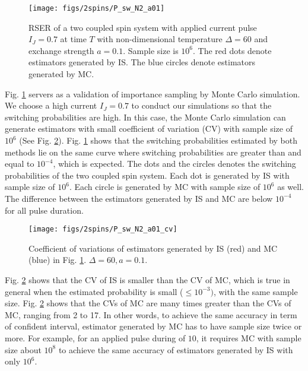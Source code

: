 \documentclass[journal,transmag]{IEEEtran}
\begin{document}
  \begin{figure}[h]
   \centering
         \texttt{[image: figs/2spins/P\_sw\_N2\_a01]}    
   \caption{RSER of a two coupled spin system with applied current pulse $I_J = 0.7$ at time $T$ with non-dimensional temperature $\Delta = 60$ and exchange strength $ a = 0.1$. Sample size is $10^6$. The red dots denote estimators generated by IS.  The blue circles denote estimators generated by MC.  }
   \label{figs:ISvsMC1_1}
\end{figure}
Fig. \ref{figs:ISvsMC1_1} servers as a validation of importance sampling by Monte Carlo simulation. We choose a high current $I_J = 0.7$ to conduct our simulations so that the switching probabilities are high. In this case, the Monte Carlo simulation can generate estimators with small coefficient of variation (CV) with sample size of $10^6$ (See Fig. \ref{figs:ISvsMC1_2}). 
Fig. \ref{figs:ISvsMC1_1}  shows that the switching probabilities estimated by both methods lie on the same curve where switching probabilities are greater than and equal to $10^{-4}$, which is expected. The dots and the circles denotes the switching probabilities of the two coupled spin system. Each dot is generated by IS with sample size of $10^6$. Each circle is generated by MC with sample size of $10^6$ as well.  The difference between the estimators generated by IS and MC are below $10^{-4}$ for all pulse duration.
  \begin{figure}[h]
   \centering
         \texttt{[image: figs/2spins/P\_sw\_N2\_a01\_cv]}    
   \caption{Coefficient of variations of estimators generated by IS (red) and MC (blue) in Fig. \ref{figs:ISvsMC1_1}. $\Delta = 60, a = 0.1$. }
   \label{figs:ISvsMC1_2}
\end{figure}
%
Fig. \ref{figs:ISvsMC1_2} shows that the CV of IS is smaller than the CV of MC, which is true in general when the estimated probability is small ($ \le 10^{-3})$, with the same sample size. Fig. \ref{figs:ISvsMC1_2} shows that the CVs of MC are many times greater than the CVs of MC, ranging from 2 to 17. In other words, to achieve the same accuracy in term of confident interval, estimator generated by MC has to have sample size twice or more. For example, for an applied pulse during of $10$, it requires MC with sample size about $10^8$ to achieve the same accuracy of estimators generated by IS with only $10^6$.
%
\end{document}
